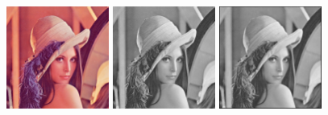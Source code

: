 \begin{figure}[H]
  \centering
    \includegraphics[width=0.30\textwidth]{images/Lenna.jpg}
    \quad
    \includegraphics[width=0.30\textwidth]{images/lenna_grey.jpeg}
    \quad
    \includegraphics[width=0.30\textwidth]{images/lenna_blurred.jpeg}


\end{figure}
